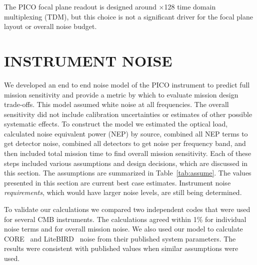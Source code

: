 \documentclass[]{spie}  %
\begin{document}
The PICO focal plane readout is designed around $\times$128 time domain multiplexing (TDM), but this choice is not a 
significant driver for the focal plane layout or overall noise budget. 


\section{INSTRUMENT NOISE}
\label{sec:noise}

We developed an end to end noise model of the PICO instrument to predict full mission sensitivity and 
provide a metric by which to evaluate mission design trade-offs.  This model assumed white noise
at all frequencies. The overall sensitivity did not include calibration uncertainties or estimates of other possible 
systematic effects. To construct the model we estimated the 
optical load, calculated noise equivalent power (NEP) by source, 
combined all NEP terms to get detector noise, combined all detectors to get noise per frequency band, and then 
included total mission time to find overall mission sensitivity.\cite{suzuki2013_thesis,aubin2013_thesis}  
Each of these steps included various assumptions and design decisions, 
which are discussed in this section.  The assumptions are summarized in Table~\ref{tab:assume}.
The values presented in this section are current best case estimates. Instrument noise {\it requirements}, which would have larger 
noise levels, are still being determined.

To validate our calculations we compared two independent codes that were used for several 
CMB instruments.  The calculations agreed within 1\% for individual noise terms 
and for overall mission noise.  We also used our model to calculate CORE~\cite{core} and LiteBIRD~\cite{litebird,suzukiprivate} 
noise from their published system parameters. The 
results were consistent with published values when similar assumptions were used.  
\end{document}
